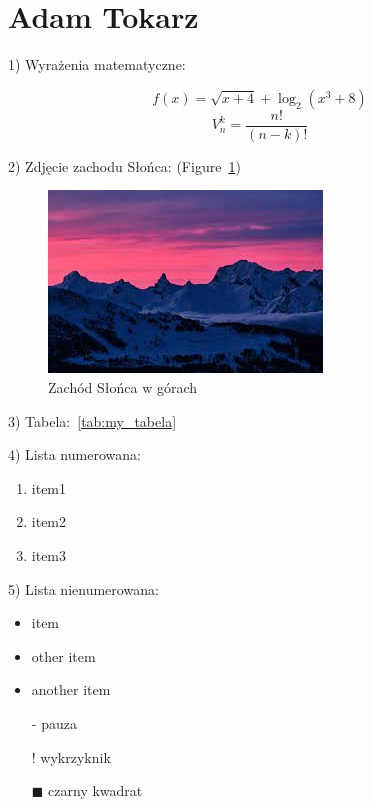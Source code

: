 \section{Adam Tokarz}

1) Wyrażenia matematyczne:

\begin{center}
    \begin{equation}
        f(x)=\sqrt{x+4}+\log_{2}({x^{3}+8})
    \end{equation}
    \begin{equation}
        V_{n}^{k}=\frac{n!}{(n-k)!}
    \end{equation}
\end{center}

2) Zdjęcie zachodu Słońca: (Figure~\ref{fig:sunset})
\begin{figure} [htbp]
    \centering
    \includegraphics[scale=0.75]{pictures/sunset.jpg}
    \caption{Zachód Słońca w górach}
    \label{fig:sunset}
\end{figure}


3) Tabela:~\ref{tab:my_tabela}



4) Lista numerowana:
\begin{enumerate}
    \item item1
    \item item2
    \item item3
\end{enumerate}

5) Lista nienumerowana:
\begin{itemize}
    \item item
    \item other item
    \item another item
\end{itemize}

\begin{itemize}
    \item[-] pauza
    \item[!] wykrzyknik
    \item[$\blacksquare$] czarny kwadrat
\end{itemize}

